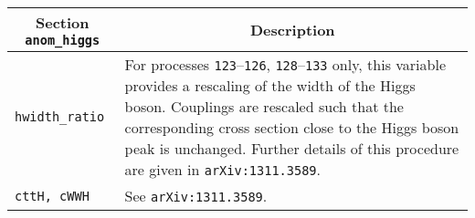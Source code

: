 	\begin{longtable}{p{1.5cm}p{12cm}}
		\toprule
		\multicolumn{1}{c}{{\textbf{Section} \texttt{anom\_higgs}}} & \multicolumn{1}{c}{{\textbf{Description}}} \\ 
		\midrule
		{\tt hwidth\_ratio} & For processes {\tt 123}--{\tt 126}, {\tt 128}--{\tt 133} only,
		this variable provides a rescaling of the width of the Higgs boson.  Couplings are rescaled such that the
		corresponding cross section close to the Higgs boson peak is unchanged.  Further details of this procedure are 
		given in
		{\tt arXiv:1311.3589}. \\
		\texttt{cttH, cWWH} & See {\tt arXiv:1311.3589}. \\
		\bottomrule
	\end{longtable}
